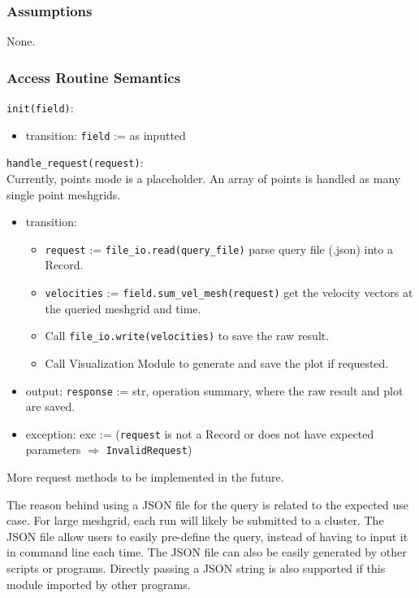 \documentclass[12pt, titlepage]{article}
\begin{document}
\subsubsection{Assumptions}
None.

\subsubsection{Access Routine Semantics}

\noindent \texttt{init(field)}:
\begin{itemize}
\item transition: \texttt{field} := as inputted
\end{itemize}

\noindent \texttt{handle\_request(request)}:\\
\noindent Currently, points mode is a placeholder. An array of points is handled as many single point meshgrids.
\begin{itemize}
\item transition:
  \begin{itemize}
    \item \texttt{request} := \texttt{file\_io.read(query\_file)} parse query file (.json) into a Record.
    \item \texttt{velocities} := \texttt{field.sum\_vel\_mesh(request)} get the velocity vectors at the queried meshgrid and time.
    \item Call \texttt{file\_io.write(velocities)} to save the raw result.
    \item Call Visualization Module to generate and save the plot if requested.
  \end{itemize}
\item output: \texttt{response} := str, operation summary, where the raw result and plot are saved.
\item exception: exc := (\texttt{request} is not a Record or does not have expected parameters $\Rightarrow$ \texttt{InvalidRequest})
\end{itemize}
\noindent More request methods to be implemented in the future.

\noindent The reason behind using a JSON file for the query is related to the expected use case. For large meshgrid, each run will likely be submitted to a cluster. The JSON file allow users to easily pre-define the query, instead of having to input it in command line each time. The JSON file can also be easily generated by other scripts or programs. Directly passing a JSON string is also supported if this module imported by other programs.
\end{document}
